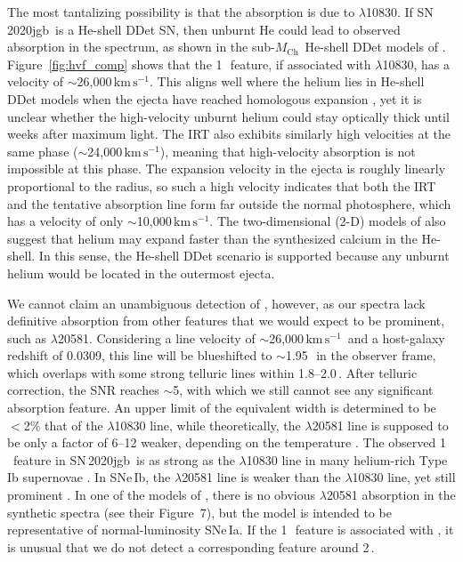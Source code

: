 \documentclass[twocolumn]{aastex631}
\newcommand{\sn}{SN\,2020jgb}
\newcommand{\Mch}{$M_\mathrm{Ch}$}
\newcommand{\kms}{$\mathrm{km}\,\mathrm{s}^{-1}$}
\begin{document}
The most tantalizing possibility is that the absorption is due to  $\lambda$10830. If \sn\ is a He-shell DDet SN, then unburnt He could lead to observed absorption in the spectrum, as shown in the sub-\Mch\ He-shell DDet models of \citet{Boyle2017_Helium}. Figure~\ref{fig:hvf_comp} shows that the 1\,\micron\ feature, if associated with  $\lambda$10830, has a velocity of $\sim$26,000\,\kms. This aligns well where the helium lies in He-shell DDet models when the ejecta have reached homologous expansion \citep{Kromer_DD_2010, polin_observational_2019}, yet it is unclear whether the high-velocity unburnt helium could stay optically thick until weeks after maximum light. The  IRT also exhibits similarly high velocities at the same phase ($\sim$24,000\,\kms), meaning that high-velocity absorption is not impossible at this phase. The expansion velocity in the ejecta is roughly linearly proportional to the radius, so such a high velocity indicates that both the  IRT and the tentative  absorption line form far outside the normal photosphere, which has a velocity of only $\sim$10,000\,\kms. The two-dimensional (2-D) models of \citet{Kromer_DD_2010} also suggest that helium may expand faster than the synthesized calcium in the He-shell. In this sense, the He-shell DDet scenario is supported because any unburnt helium would be located in the outermost ejecta.

We cannot claim an unambiguous detection of , however, as our spectra lack definitive absorption from other  features that we would expect to be prominent, such as  $\lambda$20581. Considering a line velocity of $\sim$26,000\,\kms\ and a host-galaxy redshift of 0.0309, this line will be blueshifted to $\sim$1.95\,\micron\ in the observer frame, which overlaps with some strong telluric lines within 1.8--2.0\,\micron. After telluric correction, the SNR reaches $\sim$5, with which we still cannot see any significant absorption feature. An upper limit of the equivalent width is determined to be $<$2\% that of the  $\lambda$10830 line, while theoretically, the $\lambda$20581 line is supposed to be only a factor of 6--12 weaker, depending on the temperature \citep{Marion2009_NIR}. The observed 1\,\micron\ feature in \sn\ is as strong as the  $\lambda$10830 line in many helium-rich Type Ib supernovae \citep[SNe\,Ib; see][for a review of SN spectral classification]{Filippenko97}. In SNe\,Ib, the  $\lambda$20581 line is weaker than the  $\lambda$10830 line, yet still prominent \citep{CSP_Ibc_2022}. In one of the models of \citet{Boyle2017_Helium}, there is no obvious  $\lambda$20581 absorption in the synthetic spectra (see their Figure~7), but the model is intended to be representative of normal-luminosity SNe\,Ia. If the 1\,\micron\ feature is associated with , it is unusual that we do not detect a corresponding feature around 2\,\micron.
\end{document}
